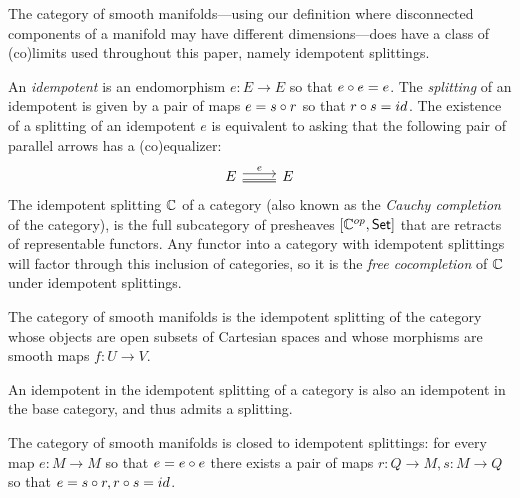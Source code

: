 The category of smooth manifolds---using our definition where disconnected components of a manifold may have different dimensions---does have a class of (co)limits used throughout this paper, namely idempotent splittings.
\begin{definition}[\cite{MR850528}]
    An \emph{idempotent} is an endomorphism $e:E \to E$ so that $e \circ e = e$. The \emph{splitting} of an idempotent is given by a pair of maps $e = s\circ r$ so that $r \circ s = id$. The existence of a splitting of an idempotent $e$ is equivalent to asking that the following pair of parallel arrows has a (co)equalizer:
    \[\begin{tikzcd}
        E & E
        \arrow["e", shift left=1, from=1-1, to=1-2]
        \arrow[shift right=1, Rightarrow, no head, from=1-1, to=1-2]
    \end{tikzcd}\]
    The idempotent splitting $\mathbb{C}$ of a category (also known as the \emph{Cauchy completion} of the category), is the full subcategory of presheaves $[\mathbb{C}^{op}, \mathsf{Set}]$ that are retracts of representable functors.
    Any functor into a category with idempotent splittings will factor through this inclusion of categories, so it is the \emph{free cocompletion} of $\mathbb{C}$ under idempotent splittings.
\end{definition}
\begin{proposition}[\cite{MR1003203}]
    The category of smooth manifolds is the idempotent splitting of the category whose objects are open subsets of Cartesian spaces and whose morphisms are smooth maps $f: U \to V$.
\end{proposition}
An idempotent in the idempotent splitting of a category is also an idempotent in the base category, and thus admits a splitting.
\begin{corollary}
    The category of smooth manifolds is closed to idempotent splittings: for every map $e:M \to M$ so that $e = e \circ e$ there exists a pair of maps $r:Q \to M, s:M \to Q$ so that $e = s\circ r, r \circ s = id$.
\end{corollary}

